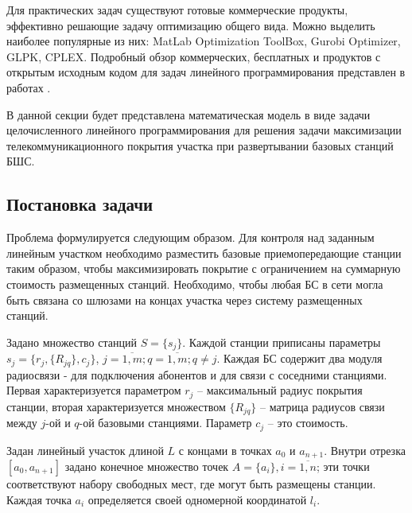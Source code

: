 



Для  практических задач существуют готовые коммерческие продукты, эффективно решающие задачу оптимизацию общего вида. Можно выделить наиболее популярные из них: MatLab Optimization ToolBox, Gurobi Optimizer, GLPK, CPLEX. Подробный обзор коммерческих, бесплатных и продуктов с открытым исходным кодом для задач линейного программирования представлен в работах \cite{Meindl2012, Ku2016, Anand2017}. 

В данной секции будет представлена математическая модель в виде задачи целочисленного линейного программирования для решения задачи максимизации телекоммуникационного покрытия участка при развертывании базовых станций БШС.

\subsection{Постановка задачи}

Проблема формулируется следующим образом. Для контроля над заданным линейным участком необходимо разместить базовые приемопередающие станции таким образом, чтобы максимизировать покрытие с ограничением на суммарную стоимость размещенных станций. Необходимо, чтобы любая БС в сети могла быть связана со шлюзами на концах участка через систему размещенных станций.

Задано множество станций $S = \{s_j\}$. Каждой станции приписаны параметры  $s_j = \{r_j, \{R_{jq}\}, c_j \}$, $j = \overline{1,m}; q = \overline{1,m}; q \neq j$. 
Каждая БС содержит два модуля радиосвязи - для подключения абонентов и для связи с соседними станциями. Первая характеризуется параметром $r_j$ -- максимальный радиус покрытия станции, вторая характеризуется множеством $\{R_{jq} \}$ -- матрица радиусов связи между $j$-ой и $q$-ой базовыми станциями. Параметр $c_j$ -- это стоимость. 

Задан линейный участок длиной $L$ с концами в точках $a_0$ и $a_{n+1}$. Внутри  отрезка $[a_0, a_{n+1}]$ задано конечное множество точек $A=\{a_i\}, i=\overline{1,n}$; эти точки соответствуют набору свободных мест, где могут быть размещены станции. Каждая точка $a_i$ определяется своей одномерной координатой $l_i$.

